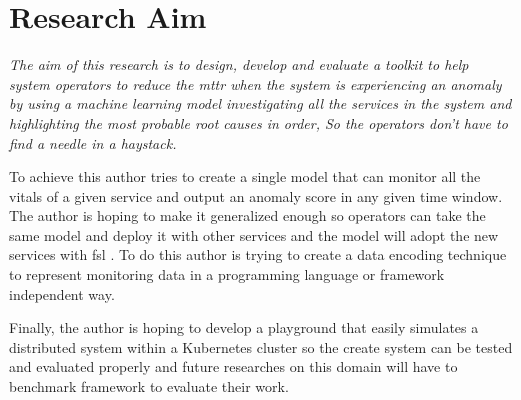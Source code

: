 \section{Research Aim}

\textit{The aim of this research is to design, develop and evaluate a toolkit to help system operators to reduce the \ac{mttr} when the system is experiencing an anomaly by using a machine learning model investigating all the services in the system and highlighting the most probable root causes in order, So the operators don't have to find a needle in a haystack.}

To achieve this author tries to create a single model that can monitor all the vitals of a given service and output an anomaly score in any given time window. The author is hoping to make it generalized enough so operators can take the same model and deploy it with other services and the model will adopt the new services with \ac{fsl} \citep{wang2020generalizing}. To do this author is trying to create a data encoding technique to represent monitoring data in a programming language or framework independent way.

Finally, the author is hoping to develop a playground that easily simulates a distributed system within a Kubernetes cluster so the create system can be tested and evaluated properly and future researches on this domain will have to benchmark framework to evaluate their work.

